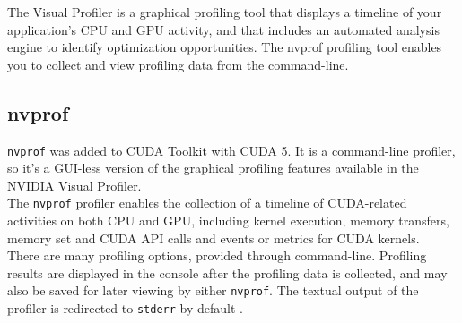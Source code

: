 	The Visual Profiler is a graphical profiling tool that displays a timeline of your application's CPU and GPU activity, and that includes an automated analysis engine to identify optimization opportunities. The nvprof profiling tool enables you to collect and view profiling data from the command-line. 
	
	
	
	
	\subsection{nvprof}
	
	
	\texttt{nvprof} was added to CUDA Toolkit with CUDA 5. It is a command-line profiler, so it's a GUI-less version of the graphical profiling features available in the NVIDIA Visual Profiler.\\
	
	The \texttt{nvprof} profiler enables the collection of a timeline of CUDA-related activities on both CPU and GPU, including kernel execution, memory transfers, memory set and CUDA API calls and events or metrics for CUDA kernels.\\
	
	There are many profiling options, provided through command-line. Profiling results are displayed in the console after the profiling data is collected, and may also be saved for later viewing by either \texttt{nvprof}.
	The textual output of the profiler is redirected to \texttt{stderr} by default \cite{profilersguide, nvprofarticle}.	
	
